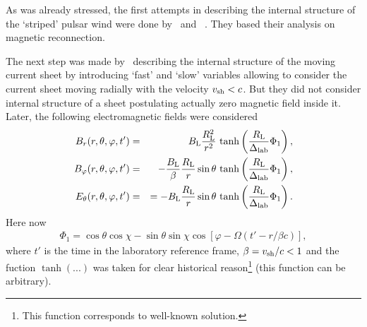 \documentclass[useAMS,usenatbib]{mn2e}
\begin{document}
As was already stressed, the first attempts in describing the internal structure 
of the `striped' pulsar wind were done by~\citet{coroniti_striped_wind_1990} and ~\citet{michel_pulsar_wind_1994}. They based their analysis on magnetic reconnection. 
%

The next step was made by~\citet{2001ApJ...547..437L} describing the internal structure 
of the moving current sheet by introducing `fast' and `slow' variables allowing to consider 
the current sheet moving radially with the velocity \mbox{$v_{\rm sh} < c$.} { But they 
did not consider internal structure of a sheet postulating actually zero magnetic field 
inside it.} Later, the following electromagnetic fields were considered~\citep{2013MNRAS.434.2636P}
\begin{eqnarray}
B_{r}(r, \theta, \varphi, t')   & = &   B_{\rm L}\frac{R_{\rm L}^2}{r^2} \, 
\tanh\left(\dfrac{R_{\rm L}}{\Delta_{\rm lab}}\Phi_{1}\right), \\
B_{\varphi}(r, \theta, \varphi, t')  & = &   -\frac{B_{\rm L}}{\beta}
\frac{R_{\rm L}}{r}\sin\theta \, \tanh\left(\dfrac{R_{\rm L}}{\Delta_{\rm lab}}\Phi_{1}\right), \\
E_{\theta}(r, \theta, \varphi, t')   & = & = 
-B_{\rm L}\frac{R_{\rm L}}{r}\sin\theta \, \tanh\left(\dfrac{R_{\rm L}}{\Delta_{\rm lab}}\Phi_{1}\right).
\label{b1999}
\end{eqnarray}
Here now
\begin{eqnarray}
\Phi_{1} =\cos\theta \cos\chi
- \sin\theta \sin\chi \cos\left[\varphi - \Omega \left(t' - r/\beta c\right)\right],
\label{Phi1}
\end{eqnarray}
where $t'$  is the time in the laboratory reference frame, $\beta = v_{\rm sh}/c <1$ and 
the fuction $\tanh(...)$ was taken for clear historical reason{\footnote{This function 
corresponds to well-known \citet{harris1962} solution.}} 
(this function can be arbitrary).
\end{document}
